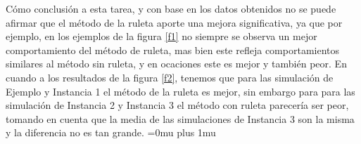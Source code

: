\documentclass{article}
\begin{document}
Cómo conclusión a esta tarea, y con base en los datos obtenidos no se puede afirmar que el método de la ruleta aporte una mejora significativa, ya que por ejemplo, en los ejemplos de la figura \ref{f1} no siempre se observa un mejor comportamiento del método de ruleta, mas bien este refleja comportamientos similares al método sin ruleta, y en ocaciones este es mejor y también peor. En cuando a los resultados de la figura \ref{f2}, tenemos que para las simulación de Ejemplo y Instancia 1 el método de la ruleta es mejor, sin embargo para para las simulación de Instancia 2 y Instancia 3 el método con ruleta parecería ser peor, tomando en cuenta que la media de las simulaciones de Instancia 3 son la misma y la diferencia no es tan grande.
\Urlmuskip=0mu plus 1mu\relax


\end{document}
